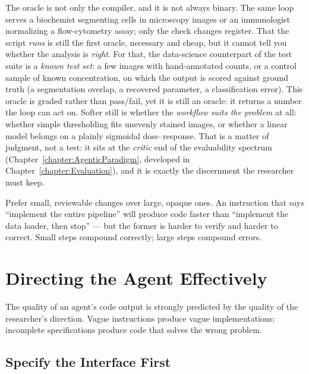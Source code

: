 \begin{remark}
The oracle is not only the compiler, and it is not always binary.
The same loop serves a biochemist segmenting cells in microscopy images or an immunologist normalizing a flow-cytometry assay; only the check changes register.
That the script \emph{runs} is still the first oracle, necessary and cheap, but it cannot tell you whether the analysis is \emph{right}.
For that, the data-science counterpart of the test suite is a \emph{known test set}: a few images with hand-annotated counts, or a control sample of known concentration, on which the output is scored against ground truth (a segmentation overlap, a recovered parameter, a classification error).
This oracle is graded rather than pass/fail, yet it is still an oracle: it returns a number the loop can act on.
Softer still is whether the \emph{workflow suits the problem} at all: whether simple thresholding fits unevenly stained images, or whether a linear model belongs on a plainly sigmoidal dose--response.
That is a matter of judgment, not a test: it sits at the \emph{critic} end of the evaluability spectrum (Chapter~\ref{chapter:AgenticParadigm}, developed in Chapter~\ref{chapter:Evaluation}), and it is exactly the discernment the researcher must keep.
\end{remark}

\begin{principle}
\label{principle:IncrementalDevelopment}
Prefer small, reviewable changes over large, opaque ones.
An instruction that says ``implement the entire pipeline'' will produce code faster than ``implement the data loader, then stop'' — but the former is harder to verify and harder to correct.
Small steps compound correctly; large steps compound errors.
\end{principle}

\section{Directing the Agent Effectively}

The quality of an agent's code output is strongly predicted by the quality of the researcher's direction.
Vague instructions produce vague implementations; incomplete specifications produce code that solves the wrong problem.

\subsection{Specify the Interface First}

